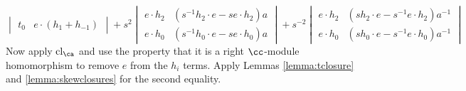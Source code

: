 \begin{example}
\[\begin{vmatrix}
t_0 & e \cdot ( h_1 + h_{-1} )
\end{vmatrix}
+ s^2
\begin{vmatrix}
e \cdot h_2 & ( s^{-1} h_2 \cdot e - s e \cdot h_2 ) a \\
e \cdot h_0 & ( s^{-1} h_0 \cdot e - s e \cdot h_0 ) a
\end{vmatrix} 
+ s^{-2}
\begin{vmatrix}
e \cdot h_2 & ( s h_2 \cdot e - s^{-1} e \cdot h_2 ) a^{-1} \\
e \cdot h_0 & ( s h_0 \cdot e - s^{-1} e \cdot h_0 ) a^{-1}
\end{vmatrix}
\]
Now apply $\cl_\ca$ and use the property that it is a right $\cc$-module homomorphism to remove $e$ from the $h_i$ terms. Apply Lemmas \ref{lemma:tclosure} and \ref{lemma:skewclosures} for the second equality.


\end{example}
